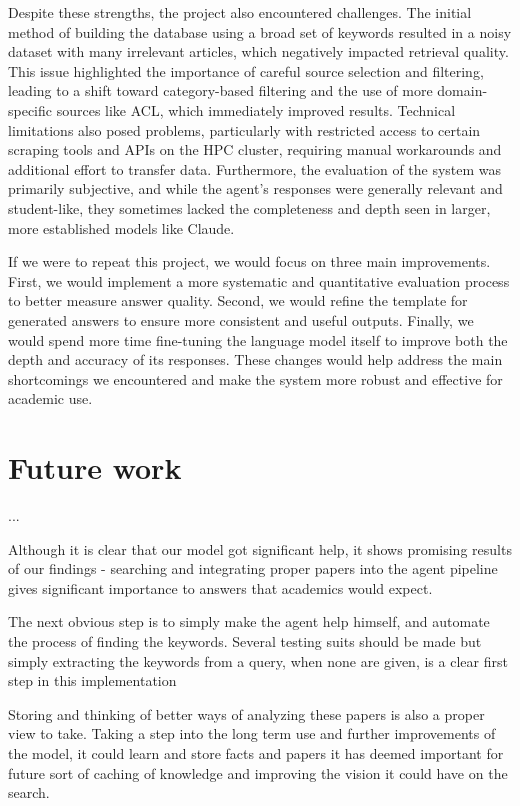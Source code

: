 \documentclass[fleqn,moreauthors,10pt]{ds_report}
\begin{document}
Despite these strengths, the project also encountered challenges. The initial method of building the database using a broad set of keywords resulted in a noisy dataset with many irrelevant articles, which negatively impacted retrieval quality. This issue highlighted the importance of careful source selection and filtering, leading to a shift toward category-based filtering and the use of more domain-specific sources like ACL, which immediately improved results. Technical limitations also posed problems, particularly with restricted access to certain scraping tools and APIs on the HPC cluster, requiring manual workarounds and additional effort to transfer data. Furthermore, the evaluation of the system was primarily subjective, and while the agent’s responses were generally relevant and student-like, they sometimes lacked the completeness and depth seen in larger, more established models like Claude.


If we were to repeat this project, we would focus on three main improvements. First, we would implement a more systematic and quantitative evaluation process to better measure answer quality. Second, we would refine the template for generated answers to ensure more consistent and useful outputs. Finally, we would spend more time fine-tuning the language model itself to improve both the depth and accuracy of its responses. These changes would help address the main shortcomings we encountered and make the system more robust and effective for academic use.


\section*{Future work}

...

Although it is clear that our model got significant help, it shows promising results of our findings - searching and integrating proper papers into the agent pipeline gives significant importance to answers that academics would expect.

The next obvious step is to simply make the agent help himself, and automate the process of finding the keywords. Several testing suits should be made but simply extracting the keywords from a query, when none are given, is a clear first step in this implementation

Storing and thinking of better ways of analyzing these papers is also a proper view to take. Taking a step into the long term use and further improvements of the model, it could learn and store facts and papers it has deemed important for future sort of caching of knowledge and improving the vision it could have on the search.
\end{document}
